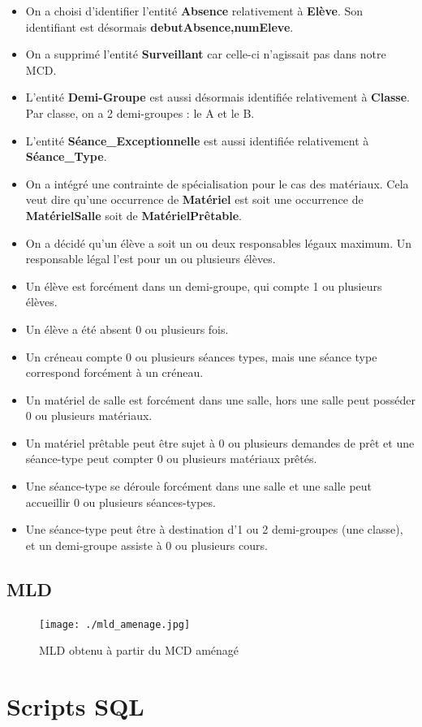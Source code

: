 \documentclass[12pt,french,titlepage]{article}
\begin{document}
	  \begin{itemize}
	      \item On a choisi d'identifier l'entité \textbf{Absence} relativement à \textbf{Elève}. Son identifiant est désormais \textbf{debutAbsence,numEleve}. 
	      \item On a supprimé l'entité \textbf{Surveillant }car celle-ci n'agissait pas dans notre MCD.
	      \item L'entité \textbf{Demi-Groupe} est aussi désormais identifiée relativement à \textbf{Classe}. Par classe, on a 2 demi-groupes : le A et le B.
	      \item L'entité \textbf{Séance\_Exceptionnelle} est aussi identifiée relativement à \textbf{Séance\_Type}. 
	      \item On a intégré une contrainte de spécialisation pour le cas des matériaux. Cela veut dire qu'une occurrence de \textbf{Matériel} est soit une occurrence de \textbf{MatérielSalle} soit de \textbf{MatérielPrêtable}.
	      \item On a décidé qu'un élève a soit un ou deux responsables légaux maximum. Un responsable légal l'est pour un ou plusieurs élèves.
	      \item Un élève est forcément dans un demi-groupe, qui compte 1 ou plusieurs élèves.
	      \item Un élève a été absent 0 ou plusieurs fois.
	      \item Un créneau compte 0 ou plusieurs séances types, mais une séance type correspond forcément à un créneau.
	      \item Un matériel de salle est forcément dans une salle, hors une salle peut posséder 0 ou plusieurs matériaux.
	      \item Un matériel prêtable peut être sujet à 0 ou plusieurs demandes de prêt et une séance-type peut compter 0 ou plusieurs matériaux prêtés.
	      \item Une séance-type se déroule forcément dans une salle et une salle peut accueillir 0 ou plusieurs séances-types.
	      \item Une séance-type peut être à destination d'1 ou 2 demi-groupes (une classe), et un demi-groupe assiste à 0 ou plusieurs cours.
	  \end{itemize}
	  
	  \subsection{MLD}
	  
	  \begin{figure}[H]
	      \centering
	      \texttt{[image: ./mld\_amenage.jpg]}
	      \caption{MLD obtenu à partir du MCD aménagé}
	      
	   
	      
	  \end{figure}
  
  \section{Scripts SQL}
  
  
	  
    

	
	
	
\end{document}
